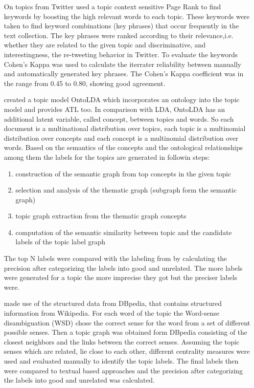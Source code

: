 On topics from Twitter \textit{\cite{Zhao2011}} used  a topic context sensitive Page Rank to find keywords by boosting the high relevant words to each topic. These keywords were taken to find keyword combinations (key phrases) that occur frequently in the text collection. The key phrases were ranked according to their relevance,i.e. whether they are related to the given topic and discriminative, and interestingness, the re-tweeting behavior in Twitter. To evaluate the keywords Cohen’s Kappa was used to calculate the iterrater reliability between manually and automatically generated key phrases. The Cohen’s Kappa coefficient was in the range from 0.45 to 0.80, showing good agreement.

\textit{\cite{Allahyari2015}} created a topic model OntoLDA which incorporates an ontology into the topic model and provides \ac{ATL} too. In comparison with \ac{LDA}, OntoLDA has an additional latent variable, called concept, between topics and words. So each document is a multinational distribution over topics, each topic is a multinomial distribution over concepts and each concept is a multinomial distribution over words.  Based on the semantics of the concepts and the ontological relationships among them the labels for the topics are generated in followin steps:
\begin{enumerate}
	\item construction of the semantic graph from top concepts in the given topic
	\item selection and analysis of the thematic graph (subgraph form the semantic graph)
	\item topic graph extraction from the thematic graph concepts
	\item computation of the semantic similarity between topic and the candidate labels of the topic label graph
\end{enumerate}
The top N labels were compared with the labeling from \textit{\cite{Mei2007}} by calculating the precision after categorizing the labels into good and unrelated. The more labels were generated for a topic the more imprecise they got but the preciser \textit{\cite{Mei2007}} labels were.

\textit{\cite{Hulpus2013}} made use of the structured data from DBpedia, that contains structured information from Wikipedia. For each word of the topic the Word-sense disambiguation (WSD) chose the correct sense for the word from a set of different possible senses. Then a topic graph was obtained form DBpedia consisting of the closest neighbors and the links between the correct senses. Assuming the topic senses which are related, lie close to each other, different centrality measures were used and evaluated manually to identify the topic labels. The final labels then were compared to textual based approaches and the precision after categorizing the labels into good and unrelated was calculated.

